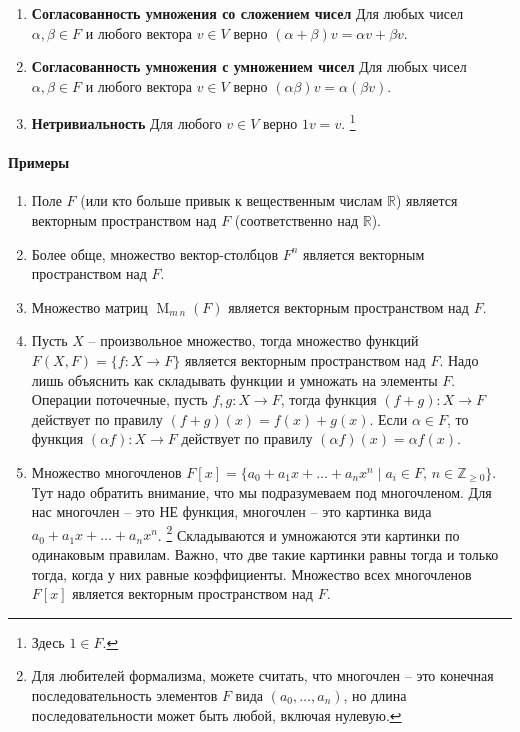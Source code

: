 \begin{definition}
\begin{enumerate}
\item {\bf Согласованность умножения со сложением чисел} Для любых чисел $\alpha, \beta\in F$ и любого вектора $v\in V$ верно $(\alpha + \beta)v = \alpha v + \beta v$.

\item {\bf Согласованность умножения с умножением чисел} Для любых чисел $\alpha,\beta\in F$ и любого вектора $v\in V$ верно $(\alpha\beta)v = \alpha(\beta v)$.

\item {\bf Нетривиальность} Для любого $v\in V$ верно $1 v = v$.%
\footnote{Здесь $1\in F$.}
\end{enumerate}
\end{definition}

\paragraph{Примеры}

\begin{enumerate}
\item Поле $F$ (или кто больше привык к вещественным числам $\mathbb R$) является векторным пространством над $F$ (соответственно над $\mathbb R$).

\item Более обще, множество вектор-столбцов $F^n$ является векторным пространством над $F$.

\item Множество матриц $\operatorname{M}_{m\,n}(F)$ является векторным пространством над $F$.

\item Пусть $X$ -- произвольное множество, тогда множество функций $F(X, F) = \{f\colon X\to F\}$ является векторным пространством над $F$.
Надо лишь объяснить как складывать функции и умножать на элементы $F$.
Операции поточечные, пусть $f,g\colon X\to F$, тогда функция $(f+g)\colon X\to F$ действует по правилу $(f+g)(x) = f(x) + g(x)$.
Если $\alpha \in F$, то функция $(\alpha f)\colon X\to F$ действует по правилу $(\alpha f)(x) = \alpha f(x)$.

\item Множество многочленов $F[x] = \{a_0+a_1x + \ldots + a_n x^n\mid a_i \in F,\,n\in \mathbb Z_{\geqslant 0}\}$.
Тут надо обратить внимание, что мы подразумеваем под многочленом.
Для нас многочлен -- это НЕ функция, многочлен -- это картинка вида $a_0 + a_1 x + \ldots + a_n x^n$.%
\footnote{Для любителей формализма, можете считать, что многочлен -- это конечная последовательность элементов $F$ вида $(a_0,\ldots,a_n)$, но длина последовательности может быть любой, включая нулевую.}
Складываются и умножаются эти картинки по одинаковым правилам.
Важно, что две такие картинки равны тогда и только тогда, когда у них равные коэффициенты.
Множество всех многочленов $F[x]$ является векторным пространством над $F$.
\end{enumerate}

